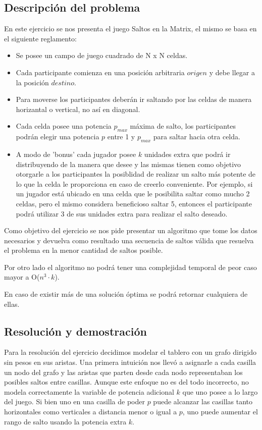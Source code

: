 \subsection{Descripci\'on del problema}

En este ejercicio se nos presenta el juego Saltos en la Matrix, el mismo se basa en el siguiente reglamento:

\begin{itemize}
\item Se posee un campo de juego cuadrado de N x N celdas.
\item Cada participante comienza en una posici\'on arbitraria $origen$ y debe llegar a la posici\'on $destino$.
\item Para moverse los participantes deber\'an ir saltando por las celdas de manera horizantal o vertical, no as\'i en diagonal.
\item Cada celda posee una potencia $p_{max}$ m\'axima de salto, los participantes podr\'an elegir una potencia $p$ entre 1 y $p_{max}$ para saltar hacia otra celda.
\item A modo de 'bonus' cada jugador posee $k$ unidades extra que podr\'a ir distribuyendo de la manera que desee y las mismas tienen como objetivo otorgarle a los participantes la posiblidad de realizar un salto m\'as potente de lo que la celda le proporciona en caso de creerlo conveniente. Por ejemplo, si un jugador est\'a ubicado en una celda que le posibilita saltar como mucho 2 celdas, pero el mismo considera beneficioso saltar 5, entonces el participante podr\'a utilizar 3 de sus unidades extra para realizar el salto deseado.
\end{itemize}

Como objetivo del ejercicio se nos pide presentar un algoritmo que tome los datos necesarios y devuelva como resultado una secuencia de saltos v\'alida que resuelva el problema en la menor cantidad de saltos posible.

Por otro lado el algoritmo no podr\'a tener una complejidad temporal de peor caso mayor a O($n^3 \cdot k$).

En caso de existir m\'as de una soluci\'on \'optima se podr\'a retornar cualquiera de ellas.


\subsection{Resoluci\'on y demostraci\'on}

Para la resoluci\'on del ejercicio decidimos modelar el tablero con un grafo dirigido sin pesos en sus aristas. Una primera intuici\'on nos llev\'o a asignarle a cada casilla un nodo del grafo y las aristas que parten desde cada nodo representaban los posibles saltos entre casillas. Aunque este enfoque no es del todo incorrecto, no modela correctamente la variable de potencia adicional $k$ que uno posee a lo largo del juego. Si bien uno en una casilla de poder $p$ puede alcanzar las casillas tanto horizontales como verticales a distancia menor o igual a $p$, uno puede aumentar el rango de salto usando la potencia extra $k$. \\


